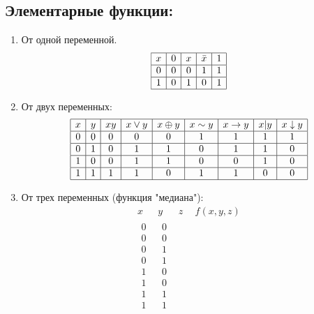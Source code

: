 \subsection{Элементарные функции:} 
\begin{enumerate}
	\item От одной переменной.
	$$
    \begin{array}{|c|c|c|c|c|}
    \hline
    x & 0 & x & \bar{x} & 1 \\
    \hline
    0 & 0 & 0 & 1 & 1 \\
    \hline
    1 & 0 & 1 & 0 & 1 \\
    \hline
    \end{array}
    $$
    \item От двух переменных:
    $$
    \begin{array}{|c|c|c|c|c|c|c|c|c|c|}
	\hline
	 x & y & xy & x\vee y & x\oplus y & x\sim y & x\rightarrow y & x|y & x\downarrow y\\
	\hline
	 0 & 0 & 0 & 0 & 0 & 1 &  1 & 1 & 1 \\
	\hline
	 0 & 1 & 0 & 1 & 1 & 0 &  1 & 1 & 0 \\
	\hline
	 1 & 0 & 0 & 1 & 1 & 0 &  0 & 1 & 0  \\
	\hline
	 1 & 1 & 1 & 1 & 0 & 1 &  1 & 0 & 0 \\
	\hline
	\end{array}
	$$
	\item
	От трех переменных (функция "медиана"):
	$$
	\begin{array}{rrr|c}
	x~~ & y~~ & z~~ & f(x,y,z)\\
	\hline
	\begin{array}{r} %
	0\\ 0\\ 0\\ 0\\ 1\\ 1\\ 1\\ 1\\
	\end{array}
	&
	\begin{array}{r}
	0\\ 0\\ 1\\ 1\\ 0\\ 0\\ 1\\ 1\\
	\end{array}

\end{array}$$
\end{enumerate}
